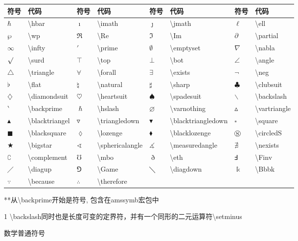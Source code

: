 \documentclass[UTF8,fontset=ubuntu]{ctexart}
\begin{document}
\begin{threeparttable}
\begin{tabular}{l l l l l l l l}
	\hline
	符号 & 代码 & 符号 & 代码 & 符号 & 代码 & 符号 & 代码\\
	\hline
	$\hbar$ & \textbackslash hbar & $\imath$ & \textbackslash imath & $\jmath$ & \textbackslash jmath & $\ell$ & \textbackslash ell\\
	$\wp$ & \textbackslash wp & $\Re$ & \textbackslash Re & $\Im$ & \textbackslash Im & $\partial$ & \textbackslash partial\\
	$\infty$ & \textbackslash infty & $\prime$ & \textbackslash prime & $\emptyset$ & \textbackslash emptyset & $\nabla$ & \textbackslash nabla\\
	$\surd$ & \textbackslash surd & $\top$ & \textbackslash top & $\bot$ & \textbackslash bot & $\angle$ & \textbackslash angle\\
	$\triangle$ & \textbackslash triangle & $\forall$ & \textbackslash forall & $\exists$ & \textbackslash exists & $\neg$ & \textbackslash neg\\
	$\flat$ & \textbackslash flat & $\natural$ & \textbackslash natural & $\sharp$ & \textbackslash sharp & $\clubsuit$ & \textbackslash clubsuit\\
	$\diamondsuit$ & \textbackslash diamondsuit & $\heartsuit$ & \textbackslash heartsuit & $\spadesuit$ & \textbackslash spadesuit & $\backslash$ & \textbackslash backslash\tnote{1}\\
	$\backprime$ & \textbackslash backprime & $\hslash$ & \textbackslash hslash & $\varnothing$ & \textbackslash varnothing & $\vartriangle$ & \textbackslash vartriangle\\
	$\blacktriangle$ & \textbackslash blacktriangel & $\triangledown$ & \textbackslash triangledown & $\blacktriangledown$ & \textbackslash blacktriangledown & $\square$ & \textbackslash square\\
	$\blacksquare$ & \textbackslash blacksquare & $\lozenge$ & \textbackslash lozenge & $\blacklozenge$ & \textbackslash blacklozenge & $\circledS$ & \textbackslash circledS\\
	$\bigstar$ & \textbackslash bigstar & $\sphericalangle$ & \textbackslash sphericalangle & $\measuredangle$ & \textbackslash measuredangle & $\nexists$ & \textbackslash nexists\\
	$\complement$ & \textbackslash complement & $\mho$ & \textbackslash mbo & $\eth$ & \textbackslash eth & $\Finv$ & \textbackslash Finv\\
	$\diagup$ & \textbackslash diagup & $\Game$ & \textbackslash Game & $\diagdown$ & \textbackslash diagdown & $\Bbbk$ & \textbackslash Bbbk\\
	$\because$ & \textbackslash because & $\therefore$ & \textbackslash therefore\\
	\hline
\end{tabular}
**从\textbackslash backprime开始是\AMS 符号, 包含在amssymb宏包中
\begin{tablenotes}
	\item[1] \textbackslash backslash同时也是长度可变的定界符，并有一个同形的二元运算符\textbackslash setminus
\end{tablenotes}
\caption{数学普通符号}
\end{threeparttable}
\end{document}
